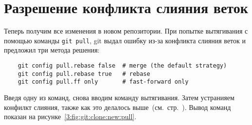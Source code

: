 \section{Разрешение конфликта слияния веток}
Теперь получим все изменения в новом репозитории.
При попытке вытягивания с помощью команды \texttt{git~pull}, git выдал
ошибку из-за конфликта слияния веток и предложил три метода решения:
\begin{verbatim}
	git config pull.rebase false  # merge (the default strategy)
	git config pull.rebase true   # rebase
	git config pull.ff only       # fast-forward only
\end{verbatim}
Введя одну из команд, снова вводим команду вытягивания. Затем устранияем
конфилкт слияния, также как это делалось
выше~(см.~стр.~\pageref{lb:Вытягивание изменений в новый клон репозитория}).
Вывод команд показан на рисунке~\ref{3:fig:git:clone:new:pull}.
